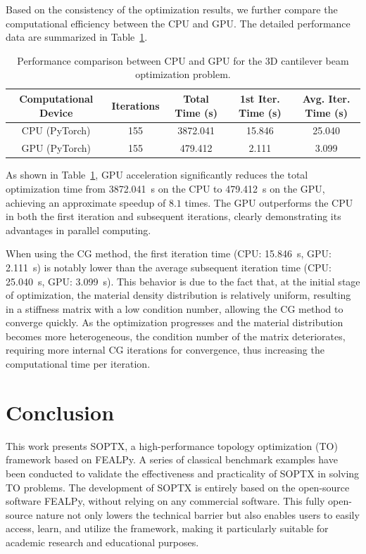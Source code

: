 \documentclass[mathpazo]{cicp}
\begin{document}
Based on the consistency of the optimization results, we further compare the computational efficiency between the CPU and GPU. The detailed performance data are summarized in Table~\ref{tab:device_performance}.
\begin{table}[htbp]
	\centering
	\setlength{\tabcolsep}{4pt} %
	\caption{Performance comparison between CPU and GPU for the 3D cantilever beam optimization problem.}
	\begin{tabular}{ccccc}
		\toprule
		\textbf{Computational Device} & \textbf{Iterations} & \textbf{Total Time (s)} & \textbf{1st Iter. Time (s)} & \textbf{Avg. Iter. Time (s)} \\
		\midrule
		CPU (PyTorch) & 155 & 3872.041 & 15.846 & 25.040 \\
		GPU (PyTorch) & 155 & 479.412 & 2.111 & 3.099 \\
		\bottomrule
	\end{tabular}
	\label{tab:device_performance}
\end{table}

As shown in Table~\ref{tab:device_performance}, GPU acceleration significantly reduces the total optimization time from \SI{3872.041}{s} on the CPU to \SI{479.412}{s} on the GPU, achieving an approximate speedup of $8.1$ times. The GPU outperforms the CPU in both the first iteration and subsequent iterations, clearly demonstrating its advantages in parallel computing.

When using the CG method, the first iteration time (CPU: \SI{15.846}{s}, GPU: \SI{2.111}{s}) is notably lower than the average subsequent iteration time (CPU: \SI{25.040}{s}, GPU: \SI{3.099}{s}). This behavior is due to the fact that, at the initial stage of optimization, the material density distribution is relatively uniform, resulting in a stiffness matrix with a low condition number, allowing the CG method to converge quickly. As the optimization progresses and the material distribution becomes more heterogeneous, the condition number of the matrix deteriorates, requiring more internal CG iterations for convergence, thus increasing the computational time per iteration.

\section{Conclusion}
This work presents SOPTX, a high-performance topology optimization (TO) framework based on FEALPy. A series of classical benchmark examples have been conducted to validate the effectiveness and practicality of SOPTX in solving TO problems. The development of SOPTX is entirely based on the open-source software FEALPy, without relying on any commercial software. This fully open-source nature not only lowers the technical barrier but also enables users to easily access, learn, and utilize the framework, making it particularly suitable for academic research and educational purposes.
\end{document}
